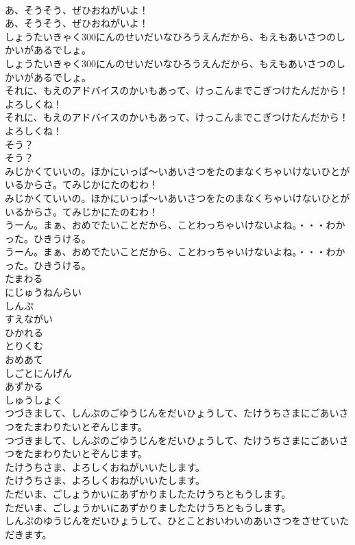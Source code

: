 \documentclass[8pt]{extreport}
\begin{document}
\begin{CJK}{UTF8}{min}
\\	あ、そうそう、ぜひおねがいよ！	
\\	あ、そうそう、ぜひおねがいよ！ 
\\	しょうたいきゃく300にんのせいだいなひろうえんだから、もえもあいさつのしかいがあるでしょ。	
\\	しょうたいきゃく300にんのせいだいなひろうえんだから、もえもあいさつのしかいがあるでしょ。 
\\	それに、もえのアドバイスのかいもあって、けっこんまでこぎつけたんだから！よろしくね！	
\\	それに、もえのアドバイスのかいもあって、けっこんまでこぎつけたんだから！よろしくね！ 
\\	そう？	
\\	そう？ 
\\	みじかくていいの。ほかにいっぱ～いあいさつをたのまなくちゃいけないひとがいるからさ。てみじかにたのむわ！	
\\	みじかくていいの。ほかにいっぱ～いあいさつをたのまなくちゃいけないひとがいるからさ。てみじかにたのむわ！ 
\\	うーん。まぁ、おめでたいことだから、ことわっちゃいけないよね。・・・わかった。ひきうける。	
\\	うーん。まぁ、おめでたいことだから、ことわっちゃいけないよね。・・・わかった。ひきうける。 
\\	たまわる
\\	にじゅうねんらい
\\	しんぷ
\\	すえながい
\\	ひかれる
\\	とりくむ
\\	おめあて
\\	しごとにんげん
\\	あずかる
\\	しゅうしょく
\\	つづきまして、しんぷのごゆうじんをだいひょうして、たけうちさまにごあいさつをたまわりたいとぞんじます。	
\\	つづきまして、しんぷのごゆうじんをだいひょうして、たけうちさまにごあいさつをたまわりたいとぞんじます。 
\\	たけうちさま、よろしくおねがいいたします。	
\\	たけうちさま、よろしくおねがいいたします。 
\\	ただいま、ごしょうかいにあずかりましたたけうちともうします。	
\\	ただいま、ごしょうかいにあずかりましたたけうちともうします。 
\\	しんぷのゆうじんをだいひょうして、ひとことおいわいのあいさつをさせていただきます。	

\end{CJK}
\end{document}
